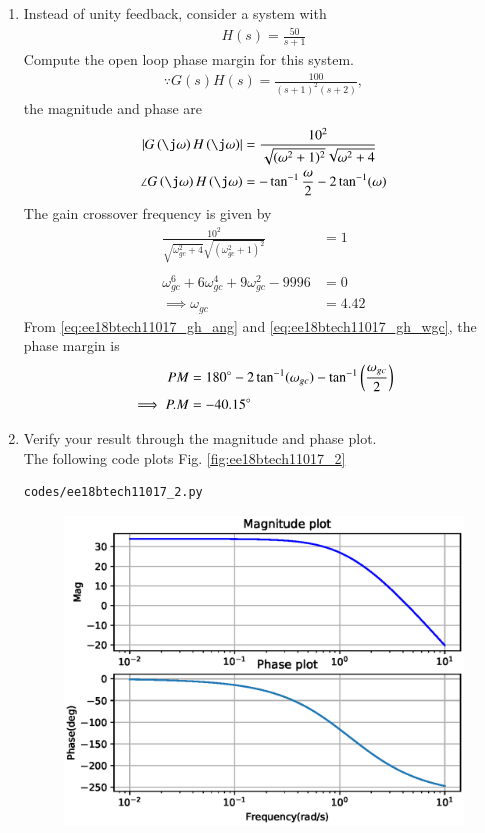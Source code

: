 \begin{enumerate}[label=\thesection.\arabic*.,ref=\thesection.\theenumi]
\item Instead of unity feedback, consider a system with 
%
\begin{align}
H(s)=\frac{50}{s+1}
\end{align}
%
Compute the open loop phase margin for this system.
\\
\solution 
%
\begin{align}
\because G(s)H(s)=\frac{100}{(s+1)^{2}(s+2)},
\label{eq:ee18btech11017_gh}
\end{align}
%
the  magnitude and phase are
\begin{align}
\label{eq:ee18btech11017_gh_mag}
\abs{G\brak{\j\omega}H\brak{\j\omega}}&=\frac{10^{2}}{ \sqrt{(\omega^{2}+1)^{2}}
\sqrt{\omega^{2}+4}} \\
\angle G\brak{\j\omega}H\brak{\j\omega}&=-\tan^{-1}\frac{\omega}{2}-2\tan^{-1}(\omega) 
\label{eq:ee18btech11017_gh_ang}
\end{align}
%
The gain crossover frequency is given by 
\begin{align}
\frac{10^{2}}{\sqrt{\omega_{gc}^{2}+4} \sqrt{(\omega_{gc}^{2}+1)^{2}}}&=1 \\
\\
\omega_{gc}^{6}+6\omega_{gc}^{4}+9\omega_{gc}^{2}-9996&=0 
\\
\implies \omega_{gc} &= 4.42  
\label{eq:ee18btech11017_gh_wgc}
\end{align}
%
From \eqref{eq:ee18btech11017_gh_ang} and \eqref{eq:ee18btech11017_gh_wgc},
the phase margin is
\begin{align}
PM &=180\degree-2\tan^{-1}(\omega_{gc})-\tan^{-1}\left(\frac{\omega_{gc}}{2}\right) \\
\implies  P.M &=-40.15\degree
\label{eq:ee18btech11017_gh_pm}
\end{align}
\item Verify your result through the magnitude and phase plot.
\\
\solution The following code plots Fig. \ref{fig:ee18btech11017_2}
\begin{lstlisting}
codes/ee18btech11017_2.py
\end{lstlisting}
\begin{figure}[!h]
  \includegraphics[width=\columnwidth]{./figs/ee18btech11017/ee18btech11017_2.eps}

\end{figure}
\end{enumerate}
